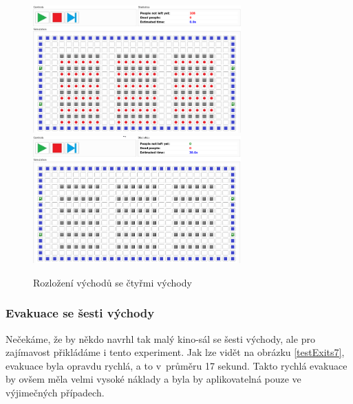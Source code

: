 \documentclass[11pt, titlepage, a4paper]{article}
\begin{document}
        \begin{figure}[H]
            \includegraphics[width=8cm]{ExitDistribution/ExitDistribSix}
            \includegraphics[width=8cm]{ExitDistribution/ExitDistribSixEnd}
            \caption{Rozložení východů se čtyřmi východy}
            \label{testExits6}
        \end{figure}
        
        \subsubsection{Evakuace se šesti východy}
        Nečekáme, že by někdo navrhl tak malý kino-sál se šesti východy, ale pro zajímavost přikládáme i tento experiment. Jak lze vidět na obrázku \ref{testExits7}, evakuace byla opravdu rychlá, a to v~průměru 17 sekund. Takto rychlá evakuace by ovšem měla velmi vysoké náklady a byla by aplikovatelná pouze ve výjimečných případech.
        
\end{document}
